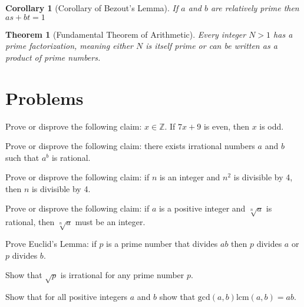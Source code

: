 \documentclass[a4paper]{exam}
\newtheorem{theorem}{Theorem}
\newtheorem{corollary}{Corollary}
\begin{document}
\begin{corollary}[Corollary of Bezout's Lemma]
    If $a$ and $b$ are relatively prime then $as+bt = 1$
\end{corollary}

\begin{theorem}[Fundamental Theorem of Arithmetic]
    Every integer $N > 1$ has a prime factorization, meaning either $N$ is itself prime or can be written as a product of prime numbers.
\end{theorem}


\pagebreak

\section*{Problems}
\begin{questions}
    \question Prove or disprove the following claim: $x \in \mathbb{Z}$. If $7x + 9$ is even, then $x$ is odd.
    \begin{solution}
    \end{solution}

    \question Prove or disprove the following claim: there exists irrational numbers $a$ and $b$ such that $a^b$ is rational.
    \begin{solution}
    \end{solution}

    \question Prove or disprove the following claim: if $n$ is an integer and $n^2$ is divisible by 4, then $n$ is divisible by 4.
    \begin{solution}
    \end{solution}

    \question Prove or disprove the following claim: if $a$ is a positive integer and $\sqrt[n]{a}$ is rational, then $\sqrt[n]{a}$ must be an integer.
    \begin{solution}
    \end{solution}
    
    \question Prove Euclid's Lemma: if $p$ is a prime number that divides $ab$ then $p$ divides $a$ or $p$ divides $b$.
    \begin{solution}
    \end{solution}

    \question Show that $\sqrt{p}$ is irrational for any prime number $p$.
    \begin{solution}
    \end{solution}

    \question Show that for all positive integers $a$ and $b$ show that $\text{gcd}(a,b) \text{lcm}(a,b)=ab$.
    \begin{solution}
    \end{solution}

\end{questions}
\end{document}
